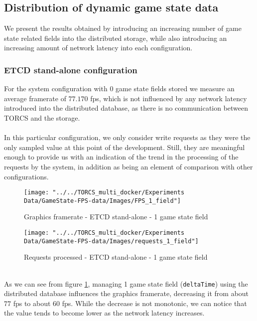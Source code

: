 \subsection{Distribution of dynamic game state data}
We present the results obtained by introducing an increasing number of game state related fields into the distributed storage, while also introducing an increasing amount of network latency into each configuration. 
\subsubsection{ETCD stand-alone configuration}
For the system configuration with 0 game state fields stored we measure an average framerate of $77.170$ fps, which is not influenced by any network latency introduced into the distributed database, as there is no communication between TORCS and the storage. \\ \\
In this particular configuration, we only consider write requests as they were the only sampled value at this point of the development. Still, they are meaningful enough to provide us with an indication of the trend in the processing of the requests by the system, in addition as being an element of comparison with other configurations.
\begin{figure}[h!]
	\centering
	\texttt{[image: "../../TORCS\_multi\_docker/Experiments Data/GameState-FPS-data/Images/FPS\_1\_field"]}
	\caption[Graphics framerate - ETCD stand-alone - 1 game state field]{Graphics framerate - ETCD stand-alone - 1 game state field}
	\label{fig:fps-1-field-etcd}
\end{figure}
\begin{figure}[h!]
	\centering
	\texttt{[image: "../../TORCS\_multi\_docker/Experiments Data/GameState-FPS-data/Images/requests\_1\_field"]}
	\caption[Requests processed - ETCD stand-alone - 1 game state field]{Requests processed - ETCD stand-alone - 1 game state field}
	\label{fig:requests-1-field-etcd}
\end{figure}
\\ As we can see from figure \ref{fig:fps-1-field-etcd}, managing 1 game state field (\texttt{deltaTime}) using the distributed database influences the graphics framerate, decreasing it from about $77$ fps to about $60$ fps. While the decrease is not monotonic, we can notice that the value tends to become lower as the network latency increases. \\ \\
